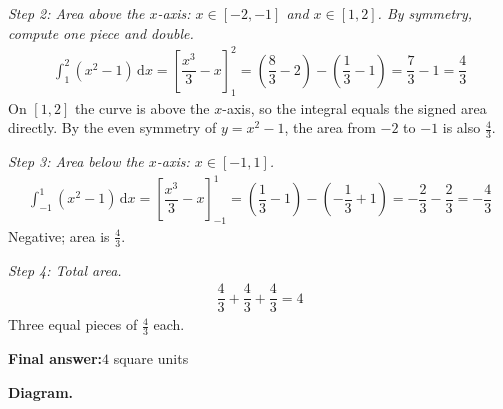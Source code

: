 \documentclass[11pt]{article}
\begin{document}
\textit{Step 2: Area above the \( x \)-axis: \( x \in [-2,-1] \) and \( x \in [1,2] \). By symmetry, compute one piece and double.}
\[\begin{gathered}
\int_1^2 (x^2 - 1)\, \mathrm{d}x = \left[\dfrac{x^3}{3} - x\right]_1^2 = \left(\dfrac{8}{3} - 2\right) - \left(\dfrac{1}{3} - 1\right) = \dfrac{7}{3} - 1 = \dfrac{4}{3}
\end{gathered}\]
On \([1,2]\) the curve is above the \( x \)-axis, so the integral equals the signed area directly. By the even symmetry of \( y = x^2 - 1 \), the area from \(-2\) to \(-1\) is also \( \tfrac{4}{3} \).

\textit{Step 3: Area below the \( x \)-axis: \( x \in [-1,1] \).}
\[\begin{gathered}
\int_{-1}^{1}(x^2 - 1)\, \mathrm{d}x = \left[\dfrac{x^3}{3} - x\right]_{-1}^{1} = \left(\dfrac{1}{3}-1\right) - \left(-\dfrac{1}{3}+1\right) = -\dfrac{2}{3} - \dfrac{2}{3} = -\dfrac{4}{3}
\end{gathered}\]
Negative; area is \( \tfrac{4}{3} \).

\textit{Step 4: Total area.}
\[\begin{gathered}
\dfrac{4}{3} + \dfrac{4}{3} + \dfrac{4}{3} = 4
\end{gathered}\]
Three equal pieces of \( \tfrac{4}{3} \) each.

\begin{answerbox}
\textbf{Final answer:}\quad \(\displaystyle 4\) square units
\end{answerbox}
\textbf{Diagram.}
\end{document}
